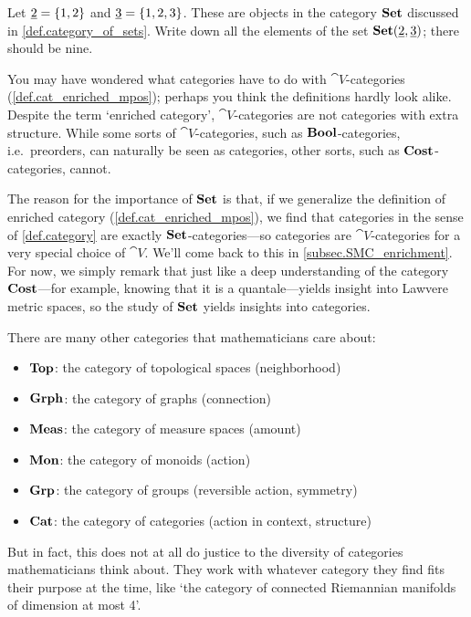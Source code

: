 \documentclass[7Sketches]{subfiles}
\begin{document}
\begin{exercise}%
\label{exc.exponential_practice}
	Let $\underline{{2}}=\{1,2\}$ and $\underline{{3}}=\{1,2,3\}$. These are objects in the
	category $\mathbf{Set}$ discussed in \cref{def.category_of_sets}. Write down all the elements of the set $\mathbf{Set}(\underline{{2}},\underline{{3}})$; there should be nine.
\end{exercise}

\begin{remark} %
\label{rem.cats_and_vcats1}%
You may have wondered what categories have to do with
$\cat{V}$-categories (\cref{def.cat_enriched_mpos}); perhaps you think the
definitions hardly look alike. Despite the term `enriched category',
$\cat{V}$-categories are not categories with extra structure. While some sorts
of $\cat{V}$-categories, such as $\mathbf{Bool}$-categories, i.e.\ preorders, can naturally be
seen as categories, other sorts, such as $\mathbf{Cost}$-categories, cannot.

The reason for the importance of $\mathbf{Set}$ is that, if we generalize the
definition of enriched category (\cref{def.cat_enriched_mpos}), we find that
categories in the sense of \cref{def.category} are exactly $\mathbf{Set}$-categories---so categories are
$\cat{V}$-categories for a very special choice of $\cat{V}$. We'll come back to
this in \cref{subsec.SMC_enrichment}.  For now, we simply remark that just like
a deep understanding of the category $\mathbf{Cost}$---for example, knowing that it is a
quantale---yields insight into Lawvere metric spaces, so the study of $\mathbf{Set}$
yields insights into categories. 
\end{remark}

There are many other categories that mathematicians care about:
\begin{itemize}%
	\item $\mathbf{Top}$: the category of topological spaces (neighborhood)
	\item $\mathbf{Grph}$: the category of graphs (connection)
	\item $\mathbf{Meas}$: the category of measure spaces (amount)
	\item $\mathbf{Mon}$: the category of monoids (action)
	\item $\mathbf{Grp}$: the category of groups (reversible action, symmetry)
	\item $\mathbf{Cat}$: the category of categories (action in context, structure)
\end{itemize}
But in fact, this does not at all do justice to the diversity of categories mathematicians
think about. They work with whatever category they find fits their purpose at
the time, like `the category of connected Riemannian manifolds of dimension at most
4'.
\end{document}
